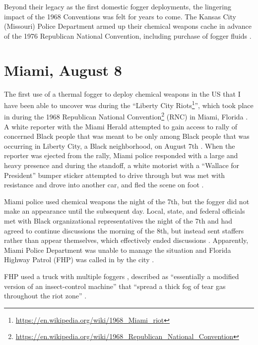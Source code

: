 \documentclass[
  11pt,
  titlepage]{krantz}
\renewcommand{\href}[2]{#2\footnote{\url{#1}}}
\begin{document}
Beyond their legacy as the first domestic fogger deployments, the lingering impact of the 1968 Conventions was felt for years to come.
The Kansas City (Missouri) Police Department armed up their chemical weapons cache in advance of the 1976 Republican National Convention, including purchase of fogger fluids \citep{Hudson1976}.

\hypertarget{MiamiFL1968_08_08}{%
\section*{Miami, August 8}\label{MiamiFL1968_08_08}}


The first use of a thermal fogger to deploy chemical weapons in the US that I have been able to uncover was during the ``\href{https://en.wikipedia.org/wiki/1968_Miami_riot}{Liberty City Riots}'', which took place in during the \href{https://en.wikipedia.org/wiki/1968_Republican_National_Convention}{1968 Republican National Convention} (RNC) in Miami, Florida \citep{Tschenschlok1995, Tschenschlok1996, McArdle2018}.
A white reporter with the Miami Herald attempted to gain access to rally of concerned Black people that was meant to be only among Black people that was occurring in Liberty City, a Black neighborhood, on August 7th \citep{Tschenschlok1995, Tschenschlok1996}.
When the reporter was ejected from the rally, Miami police responded with a large and heavy presence and during the standoff, a white motorist with a ``Wallace for President'' bumper sticker attempted to drive through but was met with resistance and drove into another car, and fled the scene on foot \citep{Tschenschlok1995, Lorentzen2018}.

Miami police used chemical weapons the night of the 7th, but the fogger did not make an appearance until the subsequent day.
Local, state, and federal officials met with Black organizational representatives the night of the 7th and had agreed to continue discussions the morning of the 8th, but instead sent staffers rather than appear themselves, which effectively ended discussions \citep{Tschenschlok1995, Tschenschlok1996}.
Apparently, Miami Police Department was unable to manage the situation and Florida Highway Patrol (FHP) was called in by the city \citep{Tschenschlok1995}.

FHP used a truck with multiple foggers \citep{Lorentzen2018}, described as ``essentially a modified version of an insect-control machine'' that ``spread a thick fog of tear gas throughout the riot zone'' \citep{Tschenschlok1995}.
\end{document}
